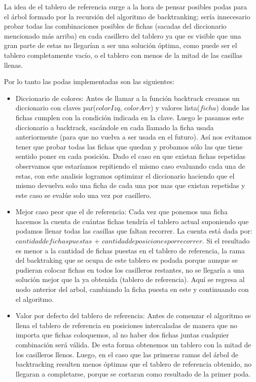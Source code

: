 La idea de el tablero de referencia surge a la hora de pensar posibles podas para el \'arbol formado por la recursi\'on del algoritmo de backtranking; ser\'ia innecesario probar todas las combinaciones posibles de fichas (sacadas del diccionario mencionado m\'as arriba) en cada casillero del tablero ya que es  visible que una gran parte de estas no llegar\'ian a ser una soluci\'on \'optima, como puede ser el tablero completamente vac\'io, o el tablero con menos de la mitad de las casillas llenas.

Por lo tanto las podas implementadas son las siguientes:

\begin{itemize}

\item Diccionario de colores: Antes de llamar a la funci\'on backtrack creamos un diccionario con claves par($colorIzq$, $colorArr$) y valores lista($ficha$) donde las fichas cumplen con la condici\'on indicada en la clave. Luego le pasamos este diccionario a backtrack, sac\'andole en cada llamado la ficha usada anteriormente (para que no vuelva a ser usada en el futuro). As\'i nos evitamos tener que probar todas las fichas que quedan y probamos s\'olo las que tiene sentido poner en cada posici\'on. Dado el caso en que existan fichas repetidas observamos que estar\'iamos repitiendo el mismo caso evaluando cada una de estas, con este analisis logramos optimizar el diccionario haciendo que el mismo devuelva solo una ficha de cada una por mas que existan repetidas y este caso se eval\'ue solo una vez por casillero.

\item Mejor caso peor que el de referencia: Cada vez que ponemos una ficha hacemos la cuenta de cu\'antas fichas tendr\'ia el tablero actual suponiendo que podamos llenar todas las casillas que faltan recorrer. La cuenta est\'a dada por: $cantidad de fichas puestas$ + $cantidad de posiciones por recorrer$. Si el resultado es menor a la cantidad de fichas puestas en el tablero de referencia, la rama del backtraking que se ocupa de este tablero es podada porque aunque se pudieran colocar fichas en todos los casilleros restantes, no se llegar\'ia a una soluci\'on mejor que la ya obtenida (tablero de referencia). Aqu\'i se regresa al nodo anterior del arbol, cambiando la ficha puesta en este y continuando con el algoritmo.

\item Valor por defecto del tablero de referencia: Antes de comenzar el algoritmo se llena el tablero de referencia en posiciones intercaladas de manera que no importa que fichas coloquemos, al no haber dos fichas juntas cualquier combinaci\'on ser\'a v\'alida. De esta forma obtenemos un tablero con la mitad de los casilleros llenos. Luego, en el caso que las primeras ramas del \'arbol de backtracking resulten menos \'optimas que el tablero de referencia obtenido, no llegaran a completarse, porque se cortaran como resultado de la primer poda.


\end{itemize}
